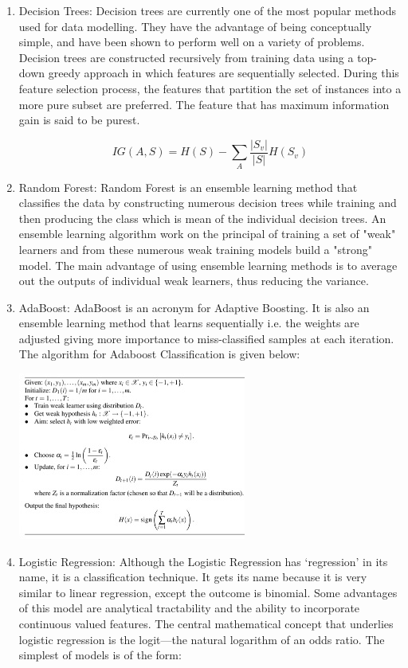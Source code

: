 \documentclass[journal]{IEEEtran}
\begin{document}
\begin{enumerate}
    \item Decision Trees: Decision trees are currently one of the most popular methods used for data modelling. They have the advantage of being conceptually simple, and have been shown to perform well on a variety of problems. Decision trees are constructed recursively from training data using a top-down greedy approach in which features are sequentially selected. During this feature selection process, the features that partition the set of instances into a more pure subset are preferred. The feature that has maximum information gain is said to be purest. 

	$$IG(A,S) = H(S) - \sum_A \frac{\left |S_v  \right | }{\left |S \right |} H(S_v)$$

    \item Random Forest: Random Forest is an ensemble learning method that classifies the data by constructing numerous decision trees while training and then producing the class which is mean of the individual decision trees. An ensemble learning algorithm work on the principal of training a set of "weak" learners and from these numerous weak training models build a "strong" model. The main advantage of using ensemble learning methods is to average out the outputs of individual weak learners, thus reducing the variance.   
    
    
    \item AdaBoost: AdaBoost is an acronym for Adaptive Boosting. It is also an ensemble learning method that learns sequentially i.e. the weights are adjusted giving more importance to miss-classified samples at each iteration. The algorithm for Adaboost Classification is given below:  

    \graphicspath{ {./images/} }
    \includegraphics{adaboost_algo.jpg}
    
    
    \item Logistic Regression: Although the Logistic Regression has ‘regression’ in its name, it is a classification technique. It gets its name because it is very similar to linear regression, except the outcome is binomial. Some advantages of this model are analytical tractability and the ability to incorporate continuous valued features. The central mathematical concept that underlies logistic regression is the logit—the natural logarithm of an odds ratio. The simplest of models is of the form:


\end{enumerate}
\end{document}
